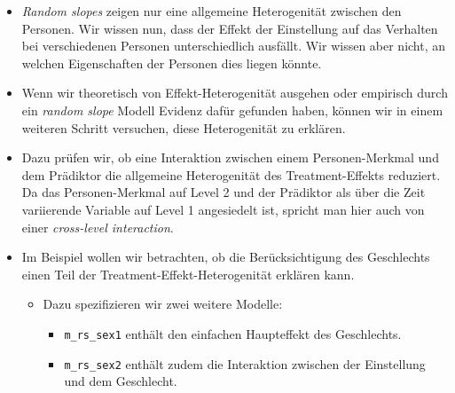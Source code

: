 \documentclass[
]{book}
\newenvironment{Shaded}{\begin{snugshade}}{\end{snugshade}}
\newcommand{\CommentTok}[1]{\textcolor[rgb]{0.56,0.35,0.01}{\textit{#1}}}
\newcommand{\DataTypeTok}[1]{\textcolor[rgb]{0.13,0.29,0.53}{#1}}
\newcommand{\KeywordTok}[1]{\textcolor[rgb]{0.13,0.29,0.53}{\textbf{#1}}}
\newcommand{\NormalTok}[1]{#1}
\newcommand{\OperatorTok}[1]{\textcolor[rgb]{0.81,0.36,0.00}{\textbf{#1}}}
\newcommand{\OtherTok}[1]{\textcolor[rgb]{0.56,0.35,0.01}{#1}}
\newcommand{\StringTok}[1]{\textcolor[rgb]{0.31,0.60,0.02}{#1}}
\providecommand{\tightlist}{%
  \setlength{\itemsep}{0pt}\setlength{\parskip}{0pt}}
\begin{document}
\begin{itemize}
\item
  \emph{Random slopes} zeigen nur eine allgemeine Heterogenität zwischen den Personen. Wir wissen nun, dass der Effekt der Einstellung auf das Verhalten bei verschiedenen Personen unterschiedlich ausfällt. Wir wissen aber nicht, an welchen Eigenschaften der Personen dies liegen könnte.
\item
  Wenn wir theoretisch von Effekt-Heterogenität ausgehen oder empirisch durch ein \emph{random slope} Modell Evidenz dafür gefunden haben, können wir in einem weiteren Schritt versuchen, diese Heterogenität zu erklären.
\item
  Dazu prüfen wir, ob eine Interaktion zwischen einem Personen-Merkmal und dem Prädiktor die allgemeine Heterogenität des Treatment-Effekts reduziert. Da das Personen-Merkmal auf Level 2 und der Prädiktor als über die Zeit variierende Variable auf Level 1 angesiedelt ist, spricht man hier auch von einer \emph{cross-level interaction}.
\item
  Im Beispiel wollen wir betrachten, ob die Berücksichtigung des Geschlechts einen Teil der Treatment-Effekt-Heterogenität erklären kann.

  \begin{itemize}
  \tightlist
  \item
    Dazu spezifizieren wir zwei weitere Modelle:

    \begin{itemize}
    \tightlist
    \item
      \texttt{m\_rs\_sex1} enthält den einfachen Haupteffekt des Geschlechts.
    \item
      \texttt{m\_rs\_sex2} enthält zudem die Interaktion zwischen der Einstellung und dem Geschlecht.
    \end{itemize}
  \end{itemize}
\end{itemize}

\begin{Shaded}
\end{Shaded}
\end{document}
